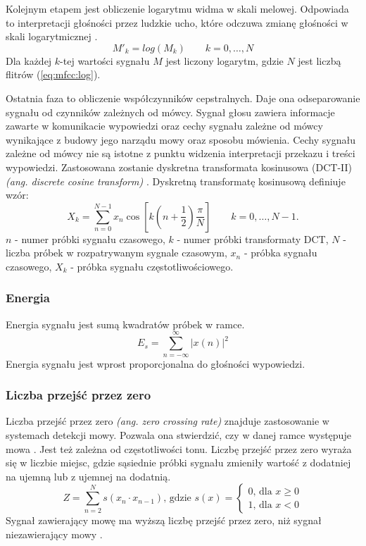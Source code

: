 \documentclass[a4paper,12pt,twoside,openany]{report}
\newcommand{\ang}[1]{\textit{(ang. #1)}}
\newcommand{\Eq}[1]{(\ref{#1})}
\begin{document}
Kolejnym etapem jest obliczenie logarytmu widma w skali melowej.
Odpowiada to interpretacji głośności przez ludzkie ucho,
które odczuwa zmianę głośności w skali logarytmicznej \cite{Hossan2013}.
\begin{equation}
	M'_k=log(M_k)\qquad k=0, \dots, N
	\label{eq:mfcc:log}
\end{equation}
Dla każdej $k$-tej wartości sygnału $M$ jest liczony logarytm, gdzie $N$ jest liczbą flitrów \Eq{eq:mfcc:log}.

Ostatnia faza to obliczenie współczynników cepstralnych.
Daje ona odseparowanie sygnału od czynników zależnych od mówcy.
Sygnał głosu zawiera informacje zawarte w komunikacie wypowiedzi oraz 
cechy sygnału zależne od mówcy wynikające z budowy jego narządu mowy oraz sposobu mówienia.
Cechy sygnału zależne od mówcy nie są istotne z punktu widzenia interpretacji przekazu i treści wypowiedzi.
Zastosowana zostanie dyskretna transformata kosinusowa (DCT-II) \ang{discrete cosine transform} \cite{Hossan2013}.
Dyskretną transformatę kosinusową definiuje wzór:
\begin{equation}
	X_k =
	 \sum_{n=0}^{N-1} x_n \cos \left[k \left(n+\frac{1}{2}\right) \frac{\pi}{N} \right] \quad \quad k = 0, \dots, N-1.
\end{equation}
$n$ - numer próbki sygnału czasowego,
$k$ - numer próbki transformaty DCT,
$N$ - liczba próbek w rozpatrywanym sygnale czasowym,
$x_n$ - próbka sygnału czasowego,
$X_k$ - próbka sygnału częstotliwościowego.


\subsubsection{Energia}
Energia sygnału jest sumą kwadratów próbek w ramce.
\begin{equation}
	E_{s}=\sum _{n=-\infty }^{\infty }{|x(n)|^{2}}
	\label{eq:energy}
\end{equation}
Energia sygnału jest wprost proporcjonalna do głośności wypowiedzi.
\subsubsection{Liczba przejść przez zero}
Liczba przejść przez zero \ang{zero crossing rate} znajduje zastosowanie w systemach detekcji mowy.
Pozwala ona stwierdzić, czy w danej ramce występuje mowa \cite{Walters-Williams2010}.
Jest też zależna od częstotliwości tonu. 
Liczbę przejść przez zero wyraża się w liczbie miejsc, gdzie sąsiednie próbki sygnału zmieniły wartość z dodatniej na ujemną lub z ujemnej na dodatnią.
\begin{equation}
	Z = \sum_{n=2}^{N}s(x_n \cdot x_{n-1})\text{, gdzie } s(x) = 
	\begin{cases} 
		0 \text{, dla } x \geq 0 \\
		1 \text{, dla } x < 0
	\end{cases}
	\label{eq:zcr}
\end{equation}
Sygnał zawierający mowę ma wyższą liczbę przejść przez zero, niż sygnał niezawierający mowy \cite{Walters-Williams2010}.
\end{document}
